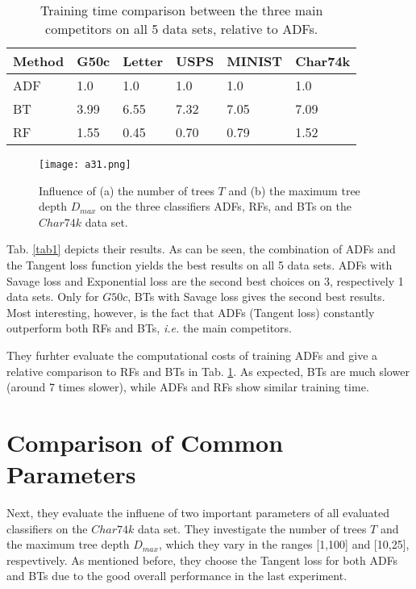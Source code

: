 \documentclass[10pt,twocolumn,letterpaper]{article}
\begin{document}
\begin{table}
\begin{center}
\begin{tabular}{p{1cm}p{0.5cm}p{0.5cm}p{0.7cm}p{1cm}p{1cm}}
  \hline
  Method & G50c & Letter & USPS & MINIST & Char74k \\
  \hline
  ADF & 1.0 & 1.0 & 1.0 & 1.0 & 1.0 \\
  BT & 3.99 & 6.55 & 7.32 & 7.05 & 7.09 \\
  RF & 1.55 & 0.45 & 0.70 & 0.79 & 1.52 \\
  \hline
\end{tabular}
\end{center}
\caption{Training time comparison between the three main competitors on all 5 data sets, relative to ADFs.}
\label{tab2}
\end{table}

\begin{figure}[htbp]
\begin{center}
\texttt{[image: a31.png]}
\end{center}
\caption{Influence of (a) the number of trees $T$ and (b) the maximum tree depth $D_{max}$ on the three classifiers ADFs, RFs, and BTs on the $Char74k$ data set.}
\label{fig}
\end{figure}

Tab. \ref{tab1} depicts their results. As can be seen, the combination of ADFs and the Tangent loss function yields the best results on all 5 data sets. ADFs with Savage loss and Exponential loss are the second best choices on 3, respectively 1 data sets. Only for $G50c$, BTs with Savage loss gives the second best results. Most interesting, however, is the fact that ADFs (Tangent loss) constantly outperform both RFs and BTs, \emph{i.e.} the main competitors.

They furhter evaluate the computational costs of training ADFs and give a relative comparison to RFs and BTs in Tab. \ref{tab2}. As expected, BTs are much slower (around 7 times slower), while ADFs and RFs show similar training time.

\section{Comparison of Common Parameters}

Next, they evaluate the influene of two important parameters of all evaluated classifiers on the $Char74k$ data set. They investigate the number of trees $T$ and the maximum tree depth $D_{max}$, which they vary in the ranges [1,100] and [10,25], respevtively. As mentioned before, they choose the Tangent loss for both ADFs and BTs due to the good overall performance in the last experiment.
\end{document}
